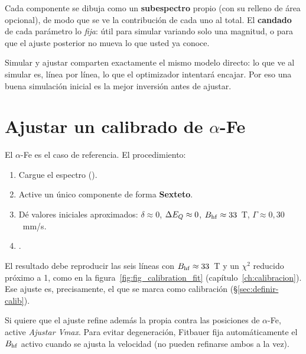 Cada componente se dibuja como un \textbf{subespectro} propio (con su relleno de
área opcional), de modo que se ve la contribución de cada uno al total. El
\textbf{candado} de cada parámetro lo \emph{fija}: útil para simular variando solo
una magnitud, o para que el ajuste posterior no mueva lo que usted ya conoce.

\begin{nota}
Simular y ajustar comparten exactamente el mismo modelo directo: lo que ve al
simular es, línea por línea, lo que el optimizador intentará encajar. Por eso una
buena simulación inicial es la mejor inversión antes de ajustar.
\end{nota}


\section{Ajustar un calibrado de $\alpha$-Fe}
\label{sec:ajustar-alphafe}

El $\alpha$-Fe es el caso de referencia. El procedimiento:

\begin{enumerate}[nosep]
  \item Cargue el espectro ().
  \item Active un único componente de forma \textbf{Sexteto}.
  \item Dé valores iniciales aproximados: $\delta \approx 0$, $\Delta E_{Q} \approx 0$,
        $B_{\mathrm{hf}} \approx 33$~T, $\Gamma \approx 0{,}30$~mm/s.
  \item {}.
\end{enumerate}

El resultado debe reproducir las seis líneas con $B_{\mathrm{hf}} \approx 33$~T y un
$\chi^2$ reducido próximo a 1, como en la figura~\ref{fig:fig_calibration_fit}
(capítulo~\ref{ch:calibracion}). Ese ajuste es, precisamente, el que se marca
como calibración (§\ref{sec:definir-calib}).

\begin{truco}
Si quiere que el ajuste refine además la propia  contra las
posiciones de $\alpha$-Fe, active \emph{Ajustar Vmax}. Para evitar
degeneración, Fitbauer fija automáticamente el $B_{\mathrm{hf}}$ activo cuando se ajusta la
velocidad (no pueden refinarse ambos a la vez).
\end{truco}


